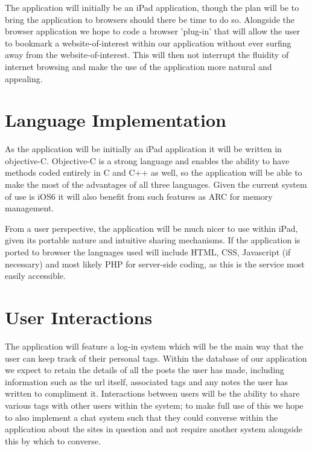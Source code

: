 \documentclass[a4wide, 10pt]{article}
\begin{document}
The application will initially be an iPad application, though the plan will be to bring the application to browsers should there be time to do so. Alongside the browser application we hope to code a browser 'plug-in' that will allow the user to bookmark a website-of-interest within our application without ever surfing away from the website-of-interest. This will then not interrupt the fluidity of internet browsing and make the use of the application more natural and appealing.

\section{Language Implementation}

As the application will be initially an iPad application it will be written in objective-C. Objective-C is a strong language and enables the ability to have methods coded entirely in C and C++ as well, so the application will be able to make the most of the advantages of all three languages. Given the current system of use is iOS6 it will also benefit from such features as ARC for memory management. 

From a user perspective, the application will be much nicer to use within iPad, given its portable nature and intuitive sharing mechanisms. If the application is ported to browser the languages used will include HTML, CSS, Javascript (if necessary) and most likely PHP for server-side coding, as this is the service most easily accessible.

\section{User Interactions}

The application will feature a log-in system which will be the main way that the user can keep track of their personal tags. Within the database of our application we expect to retain the details of all the posts the user has made, including information such as the url itself, associated tags and any notes the user has written to compliment it. Interactions between users will be the ability to share various tags with other users within the system; to make full use of this we hope to also implement a chat system such that they could converse within the application about the sites in question and not require another system alongside this by which to converse. 
\end{document}
